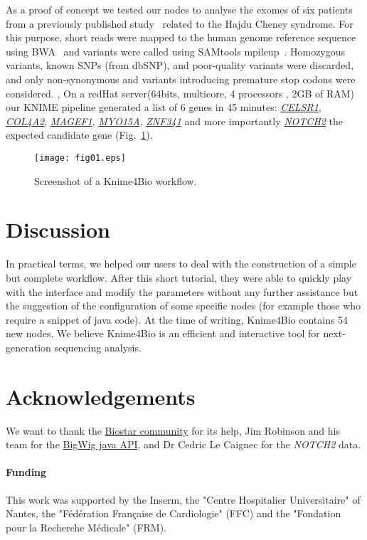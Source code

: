 \documentclass{bioinfo}
\begin{document}
As a proof of concept we tested our nodes to analyse the exomes of six patients from a previously published study~\citep{pmid21378989} related to the Hajdu Cheney syndrome. For this purpose, short reads were mapped to the human genome reference sequence using BWA~\citep{pmid20080505} and variants were called using SAMtools mpileup~\citep{pmid19505943}. Homozygous variants, known SNPs (from dbSNP), and poor-quality variants were discarded, and only non-synonymous and variants introducing premature stop codons were considered. , On a redHat server(64bits, multicore, 4 processors , 2GB of RAM) our KNIME pipeline generated a list of 6 genes in 45 minutes: \href{http://www.ncbi.nlm.nih.gov/gene/9620}{\textit{CELSR1}},  \href{http://www.ncbi.nlm.nih.gov/gene/1284}{\textit{COL4A2}}, \href{http://www.ncbi.nlm.nih.gov/gene/64110}{\textit{MAGEF1}}, \href{http://www.ncbi.nlm.nih.gov/gene/51168}{\textit{MYO15A}}, \href{http://www.ncbi.nlm.nih.gov/gene/84905}{\textit{ZNF341}} and more importantly \href{http://www.ncbi.nlm.nih.gov/gene/4853}{\textit{NOTCH2}} the expected candidate gene (Fig.~\ref{fig:x1}).

\begin{figure}[!tpb]%
\centerline{\texttt{[image: fig01.eps]}}
\caption{Screenshot of a Knime4Bio workflow.}\label{fig:x1}
\end{figure}

\section{Discussion}
In practical terms, we helped our users to deal with the construction of a simple but complete workflow. After this short tutorial, they were able to quickly play with the interface and modify the parameters without any further assistance but the suggestion of the configuration of some specific nodes (for example those who require a snippet of java code).  At the time of writing, Knime4Bio contains 54 new nodes. We believe Knime4Bio is an efficient and interactive tool for next-generation sequencing analysis.

\section*{Acknowledgements}
We want to thank the  \href{http://biostar.stackexchange.com/}{Biostar community} for its help, Jim Robinson and his team for the \href{http://code.google.com/p/bigwig/}{BigWig java API}, and Dr Cedric Le Caignec for the \textit{NOTCH2} data.

\paragraph{Funding\textcolon} This work was supported by the Inserm, the "Centre Hospitalier Universitaire" of Nantes, the "F\'{e}d\'{e}ration Fran\c{c}aise de Cardiologie" (FFC) and the "Fondation pour la Recherche M\'{e}dicale" (FRM).
\\



\end{document}
